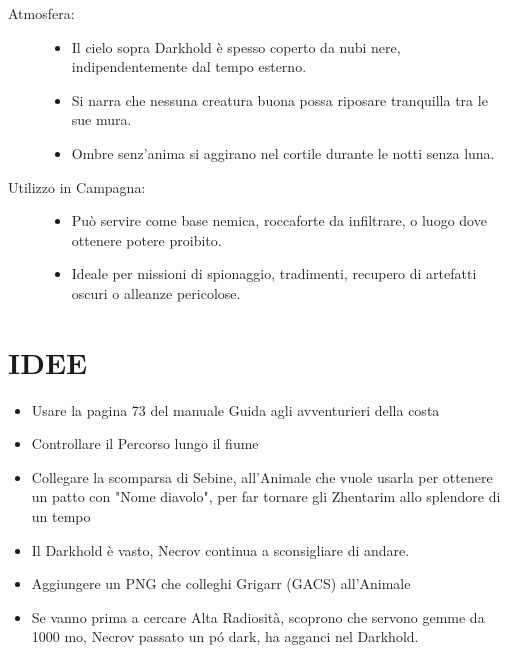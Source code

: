 \documentclass{article}
\begin{document}
\begin{description}
  \item[Atmosfera:]
  \begin{itemize}
    \item Il cielo sopra Darkhold è spesso coperto da nubi nere, indipendentemente dal tempo esterno.
    \item Si narra che nessuna creatura buona possa riposare tranquilla tra le sue mura.
    \item Ombre senz’anima si aggirano nel cortile durante le notti senza luna.
  \end{itemize}

  \item[Utilizzo in Campagna:]
  \begin{itemize}
    \item Può servire come base nemica, roccaforte da infiltrare, o luogo dove ottenere potere proibito.
    \item Ideale per missioni di spionaggio, tradimenti, recupero di artefatti oscuri o alleanze pericolose.
  \end{itemize}

\end{description}
                
\section{IDEE}


            \begin{itemize}
                \item Usare la pagina 73 del manuale Guida agli avventurieri della costa
                \item Controllare il Percorso lungo il fiume
                \item Collegare la scomparsa di Sebine,  all'Animale che vuole usarla per ottenere un patto con "Nome diavolo", per far tornare  gli Zhentarim allo splendore di un tempo
                \item Il Darkhold è vasto, Necrov continua a sconsigliare di andare.
                \item Aggiungere un PNG che colleghi Grigarr (GACS) all'Animale
                \item Se vanno prima a cercare Alta Radiosità, scoprono che servono gemme da 1000 mo, Necrov passato un pó dark, ha agganci nel Darkhold.  
            \end{itemize}
\end{document}
